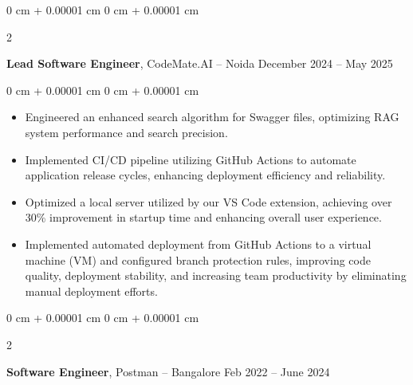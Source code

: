 \documentclass[10pt, letterpaper]{article}
\newenvironment{highlights}{
    \begin{itemize}[
        topsep=0.10 cm,
        parsep=0.10 cm,
        partopsep=0pt,
        itemsep=0pt,
        leftmargin=0 cm + 10pt
    ]
}{
    \end{itemize}
} %
\newenvironment{onecolentry}{
    \begin{adjustwidth}{
        0 cm + 0.00001 cm
    }{
        0 cm + 0.00001 cm
    }
}{
    \end{adjustwidth}
} %
\newenvironment{twocolentry}[2][]{
    \onecolentry
    \def\secondColumn{#2}
    \setcolumnwidth{\fill, 4.5 cm}
    \begin{paracol}{2}
}{
    \switchcolumn \raggedleft \secondColumn
    \end{paracol}
    \endonecolentry
} %
\begin{document}
        
        \begin{twocolentry}{
            December 2024 – May 2025
        }
            \textbf{Lead Software Engineer}, CodeMate.AI -- Noida\end{twocolentry}

        \vspace{0.10 cm}
        \begin{onecolentry}
            \begin{highlights}
                \item Engineered an enhanced search algorithm for Swagger files, optimizing RAG system performance and search precision.
                \item Implemented CI/CD pipeline utilizing GitHub Actions to automate application release cycles, enhancing deployment efficiency and reliability.
                
                \item Optimized a local server utilized by our VS Code extension, achieving over 30\% improvement in startup time and enhancing overall user experience.

                \item Implemented automated deployment from GitHub Actions to a virtual machine (VM) and configured branch protection rules, improving code quality, deployment stability, and increasing team productivity by eliminating manual deployment efforts.
                
            \end{highlights}
        \end{onecolentry}


        \vspace{0.2 cm}

        \begin{twocolentry}{
            Feb 2022 – June 2024
        }
            \textbf{Software Engineer}, Postman -- Bangalore\end{twocolentry}
\end{document}
